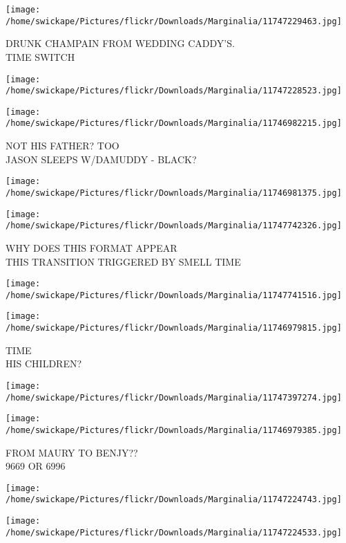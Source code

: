 \documentclass[10pt,letterpaper]{article}
\begin{document}
\vspace{0.25in}
\texttt{[image: /home/swickape/Pictures/flickr/Downloads/Marginalia/11747229463.jpg]}

DRUNK CHAMPAIN FROM WEDDING CADDY'S.\\
TIME SWITCH
\pagebreak

\texttt{[image: /home/swickape/Pictures/flickr/Downloads/Marginalia/11747228523.jpg]}

\vspace{0.25in}
\texttt{[image: /home/swickape/Pictures/flickr/Downloads/Marginalia/11746982215.jpg]}

NOT HIS FATHER? TOO\\
JASON SLEEPS W/DAMUDDY {-} BLACK?
\pagebreak

\texttt{[image: /home/swickape/Pictures/flickr/Downloads/Marginalia/11746981375.jpg]}

\vspace{0.25in}
\texttt{[image: /home/swickape/Pictures/flickr/Downloads/Marginalia/11747742326.jpg]}

WHY DOES THIS FORMAT APPEAR\\
THIS TRANSITION TRIGGERED BY SMELL TIME
\pagebreak

\texttt{[image: /home/swickape/Pictures/flickr/Downloads/Marginalia/11747741516.jpg]}

\vspace{0.25in}
\texttt{[image: /home/swickape/Pictures/flickr/Downloads/Marginalia/11746979815.jpg]}

TIME\\
HIS CHILDREN?
\pagebreak

\texttt{[image: /home/swickape/Pictures/flickr/Downloads/Marginalia/11747397274.jpg]}

\vspace{0.25in}
\texttt{[image: /home/swickape/Pictures/flickr/Downloads/Marginalia/11746979385.jpg]}

FROM MAURY TO BENJY??\\
9669 OR 6996
\pagebreak

\texttt{[image: /home/swickape/Pictures/flickr/Downloads/Marginalia/11747224743.jpg]}

\vspace{0.25in}
\texttt{[image: /home/swickape/Pictures/flickr/Downloads/Marginalia/11747224533.jpg]}
\end{document}
